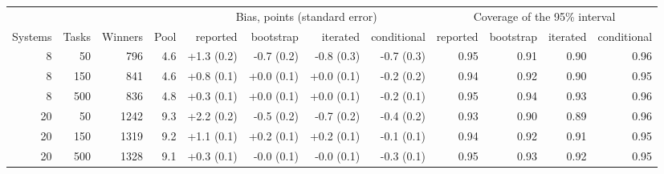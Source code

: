 \begin{tabular}{rrrrrrrrrrrr}
\toprule
 & & & & \multicolumn{4}{c}{Bias, points (standard error)} & \multicolumn{4}{c}{Coverage of the 95\% interval} \\
Systems & Tasks & Winners & Pool & reported & bootstrap & iterated & conditional & reported & bootstrap & iterated & conditional \\
\midrule
8 & 50 & 796 & 4.6 & +1.3 (0.2) & -0.7 (0.2) & -0.8 (0.3) & -0.7 (0.3) & 0.95 & 0.91 & 0.90 & 0.96 \\
8 & 150 & 841 & 4.6 & +0.8 (0.1) & +0.0 (0.1) & +0.0 (0.1) & -0.2 (0.2) & 0.94 & 0.92 & 0.90 & 0.95 \\
8 & 500 & 836 & 4.8 & +0.3 (0.1) & +0.0 (0.1) & +0.0 (0.1) & -0.2 (0.1) & 0.95 & 0.94 & 0.93 & 0.96 \\
20 & 50 & 1242 & 9.3 & +2.2 (0.2) & -0.5 (0.2) & -0.7 (0.2) & -0.4 (0.2) & 0.93 & 0.90 & 0.89 & 0.96 \\
20 & 150 & 1319 & 9.2 & +1.1 (0.1) & +0.2 (0.1) & +0.2 (0.1) & -0.1 (0.1) & 0.94 & 0.92 & 0.91 & 0.95 \\
20 & 500 & 1328 & 9.1 & +0.3 (0.1) & -0.0 (0.1) & -0.0 (0.1) & -0.3 (0.1) & 0.95 & 0.93 & 0.92 & 0.95 \\
\bottomrule
\end{tabular}
